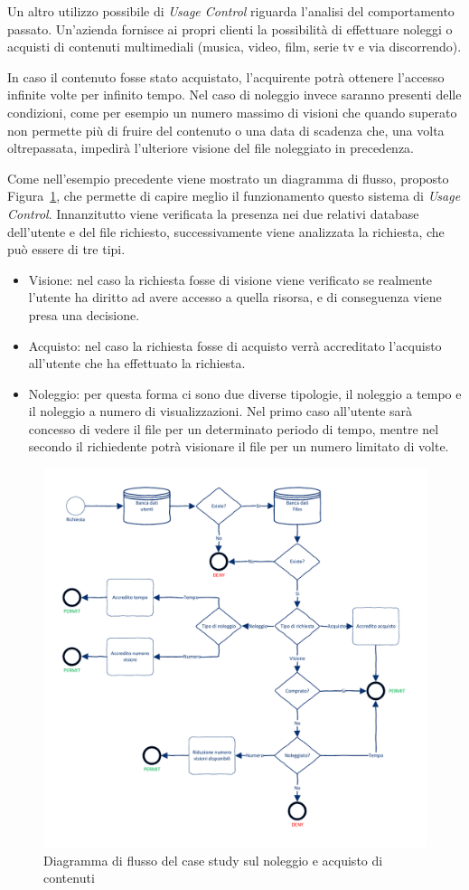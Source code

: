 Un altro utilizzo possibile di \textit{Usage Control} riguarda l'analisi del comportamento passato. Un'azienda fornisce  ai propri clienti 
la possibilità di effettuare noleggi o acquisti di contenuti multimediali (musica, video, film, serie tv e via discorrendo).\par
In caso il contenuto fosse stato acquistato, l’acquirente potrà ottenere
l’accesso infinite volte per infinito tempo. Nel caso di noleggio invece
saranno presenti delle condizioni, come per esempio un numero massimo di visioni che quando superato non permette più di fruire del contenuto o una data di scadenza che, una volta oltrepassata,
impedirà l’ulteriore visione del file noleggiato in precedenza.\par
Come nell’esempio precedente viene mostrato un diagramma di flusso,
proposto Figura~\ref{fig:diagrammaflussosecondoesempio}, che permette di capire meglio il funzionamento questo sistema di \textit{Usage Control}. Innanzitutto viene verificata la presenza nei due relativi database dell'utente e del file richiesto, successivamente viene analizzata la richiesta, che può essere di tre tipi.
\begin{itemize}
\item Visione: nel caso la richiesta fosse di visione viene verificato se realmente l'utente ha diritto ad avere accesso a quella risorsa, e di conseguenza viene presa una decisione.
\item Acquisto: nel caso la richiesta fosse di acquisto verrà accreditato l'acquisto all'utente che ha effettuato la richiesta.
\item Noleggio: per questa forma ci sono due diverse tipologie, il noleggio a tempo e il noleggio a numero di visualizzazioni. Nel primo caso all'utente sarà concesso di vedere il file per un determinato periodo di tempo, mentre nel secondo il richiedente potrà visionare il file per un numero limitato di volte.
\end{itemize}
\begin{figure}[h]
 \centering 
	\includegraphics[width = 1.1\textwidth]{./Visio_Project/DiagrammaFlussoSecondoEsempio.pdf}
 \caption{Diagramma di flusso del case study sul noleggio e acquisto di contenuti}
 \label{fig:diagrammaflussosecondoesempio}
\end{figure}
